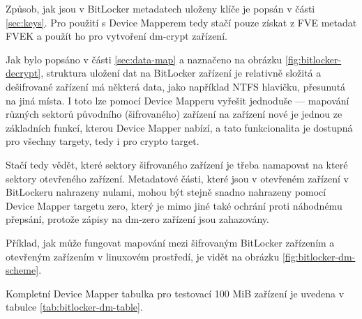 Způsob, jak jsou v BitLocker metadatech uloženy klíče je popsán v části \ref{sec:keys}. Pro použití s Device Mapperem tedy stačí pouze získat z FVE metadat FVEK a použít ho pro vytvoření dm-crypt zařízení.


Jak bylo popsáno v části \ref{sec:data-map} a naznačeno na obrázku \ref{fig:bitlocker-decrypt}, struktura uložení dat na BitLocker zařízení je relativně složitá a dešifrované zařízení má některá data, jako například NTFS hlavičku, přesunutá na jiná místa. I toto lze pomocí Device Mapperu vyřešit jednoduše --- mapování různých sektorů původního (šifrovaného) zařízení na zařízení nové je jednou ze základních funkcí, kterou Device Mapper nabízí, a tato funkcionalita je dostupná pro všechny targety, tedy i pro crypto target.

Stačí tedy vědět, které sektory šifrovaného zařízení je třeba namapovat na které sektory otevřeného zařízení. Metadatové části, které jsou v otevřeném zařízení v BitLockeru nahrazeny nulami, mohou být stejně snadno nahrazeny pomocí Device Mapper targetu zero, který je mimo jiné také ochrání proti náhodnému přepsání, protože zápisy na dm-zero zařízení jsou zahazovány\cite{KernelZero}.

Příklad, jak může fungovat mapování mezi šifrovaným BitLocker zařízením a otevřeným zařízením v linuxovém prostředí, je vidět na obrázku \ref{fig:bitlocker-dm-scheme}.

Kompletní Device Mapper tabulka pro testovací 100 MiB zařízení je uvedena v tabulce \ref{tab:bitlocker-dm-table}.


